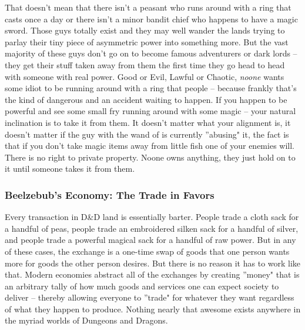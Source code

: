 That doesn't mean that there isn't a peasant who runs around with a ring that casts  once a day or there isn't a minor bandit chief who happens to have a magic sword. Those guys totally exist and they may well wander the lands trying to parlay their tiny piece of asymmetric power into something more. But the vast majority of these guys don't go on to become famous adventurers or dark lords -- they get their stuff taken away from them the first time they go head to head with someone with real power. Good or Evil, Lawful or Chaotic, \textit{noone} wants some idiot to be running around with a ring that  people -- because frankly that's the kind of dangerous and an accident waiting to happen. If you happen to be powerful and see some small fry running around with some magic -- your natural inclination is to take it from them. It doesn't matter what your alignment is, it doesn't matter if the guy with the wand of  is currently ''abusing" it, the fact is that if you don't take magic items away from little fish one of your enemies will. There is no right to private property. Noone owns anything, they just hold on to it until someone takes it from them.

\subsubsection{Beelzebub's Economy: The Trade in Favors}
\vspace*{-8pt}

Every transaction in D\&D land is essentially barter. People trade a cloth sack for a handful of peas, people trade an embroidered silken sack for a handful of silver, and people trade a powerful magical sack for a handful of raw power. But in any of these cases, the exchange is a one-time swap of goods that one person wants more for goods the other person desires. But there is no reason it has to work like that. Modern economies abstract all of the exchanges by creating ''money" that is an arbitrary tally of how much goods and services one can expect society to deliver -- thereby allowing everyone to ''trade" for whatever they want regardless of what they happen to produce. Nothing nearly that awesome exists anywhere in the myriad worlds of Dungeons and Dragons.


